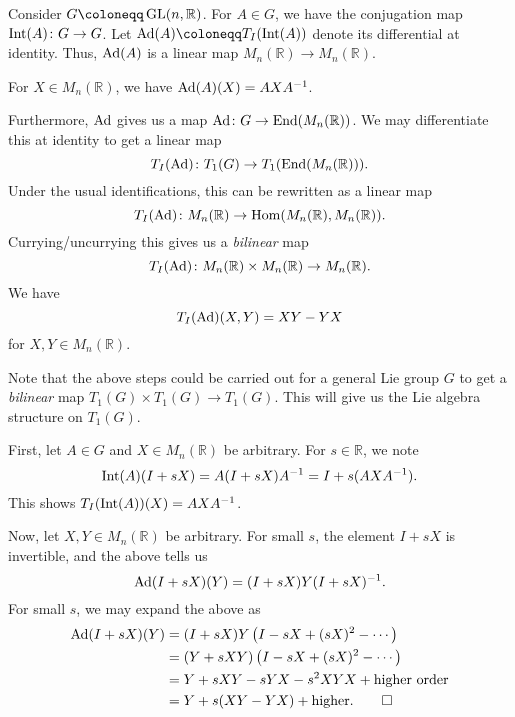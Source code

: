 \documentclass[12pt]{article}
\begin{document}
\begin{thm}
	Consider $G \coloneqq \GL(n, \mathbb{R})$. 
	For $A \in G$, we have the conjugation map $\operatorname{Int}(A) \colon G \to G$. 
	Let $\Ad(A) \coloneqq T_{I}(\INT(A))$ denote its differential at identity. Thus, $\operatorname{Ad}(A)$ is a linear map $M_{n}(\mathbb{R}) \to M_{n}(\mathbb{R})$.

	For $X \in M_{n}(\mathbb{R})$, we have $\operatorname{Ad}(A)(X) = AXA^{-1}$.

	Furthermore, $\operatorname{Ad}$ gives us a map $\operatorname{Ad} \colon G \to \operatorname{End}(M_{n}(\mathbb{R}))$. We may differentiate this at identity to get a linear map
	\begin{equation*} 
		T_{I}(\operatorname{Ad}) \colon T_{1}(G) \to T_{1}(\operatorname{End}(M_{n}(\mathbb{R}))).
	\end{equation*}
	Under the usual identifications, this can be rewritten as a linear map
	\begin{equation*} 
		T_{I}(\operatorname{Ad}) \colon M_{n}(\mathbb{R}) \to \operatorname{Hom}(M_{n}(\mathbb{R}), M_{n}(\mathbb{R})).
	\end{equation*}
	Currying/uncurrying this gives us a \emph{bilinear} map
	\begin{equation*} 
		T_{I}(\operatorname{Ad}) \colon M_{n}(\mathbb{R}) \times M_{n}(\mathbb{R}) \to M_{n}(\mathbb{R}).
	\end{equation*}
	We have
	\begin{equation*} 
		T_{I}(\operatorname{Ad})(X, Y) = XY - YX
	\end{equation*}
	for $X, Y \in M_{n}(\mathbb{R})$.
\end{thm}
Note that the above steps could be carried out for a general Lie group $G$ to get a \emph{bilinear} map $T_{1}(G) \times T_{1}(G) \to T_{1}(G)$. 
This will give us the Lie algebra structure on $T_{1}(G)$.
\begin{sketch}
	First, let $A \in G$ and $X \in M_{n}(\mathbb{R})$ be arbitrary. 
	For $s \in \mathbb{R}$, we note
	\begin{equation*} 
		\operatorname{Int}(A)(I + sX) = A(I + sX)A^{-1} = I + s(AXA^{-1}).
	\end{equation*}
	This shows $T_{I}(\operatorname{Int}(A))(X) = AXA^{-1}$.

	Now, let $X, Y \in M_{n}(\mathbb{R})$ be arbitrary. 
	For small $s$, the element $I + sX$ is invertible, and the above tells us
	\begin{equation*} 
		\operatorname{Ad}(I + sX)(Y) = (I + sX) Y (I + sX)^{-1}.
	\end{equation*}
	For small $s$, we may expand the above as
	\begin{align*} 
		\operatorname{Ad}(I + sX)(Y) &= (I + sX) Y \left(I - sX + (sX)^{2} - \cdots \right) \\
		&= (Y + sXY) \left(I - sX + (sX)^{2} - \cdots \right) \\
		&= Y + sXY - sYX - s^{2} XYX + \text{higher order} \\
		&= Y + s(XY - YX) + \text{higher}. \qedhere
	\end{align*}
\end{sketch}
\end{document}
